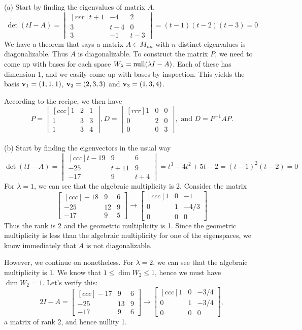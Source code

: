 \begin{solution}
\noindent 
(a) Start by finding the eigenvalues of matrix $A$.
$$
\det(t I - A) =
\begin{vmatrix}[rrr]
t +1&-4&2\\
3&t - 4&0\\
3&-1&t - 3
\end{vmatrix}
= (t - 1)(t - 2)(t - 3) = 0
$$
We have a theorem that says a matrix $A\in M_{nn}$ with $n$ distinct eigenvalues is diagonalizable. Thus $A$ is diagonalizable. To construct the matrix $P$, we need to come up with bases for each space $W_\lambda=\operatorname{null}(\lambda I-A)$. Each of these has dimension 1, and we easily come up with bases by inspection. This yields the basis ${\mathbf v}_1=(1,1,1)$, ${\mathbf v}_2=(2,3,3)$ and ${\mathbf v}_3=(1,3,4)$.  

According to the recipe, we then have 
$$
P =
\begin{bmatrix}[ccc]
1&2&1\\
1&3&3\\
1&3&4
\end{bmatrix}
,  D=
\begin{bmatrix}[rrr]
1&0&0\\
0&2&0\\
0&0&3
\end{bmatrix}, \text{ and } D=P^{-1}AP.
$$
\\
(b) 
Start by finding the eigenvectors in the usual way
$$\det(t I - A) =
\begin{vmatrix}[ccc]
t-19 &9&6\\
-25&t+11&9\\
-17&9&t +4
\end{vmatrix}
= t^3 - 4t^2+5t-2 = (t -1)^2(t-2) = 0
$$
For $\lambda = 1$, we can see that the algebraic multiplicity is 2. Consider the matrix
$$
\begin{bmatrix}[ccc]
-18 &9&6\\
-25&12&9\\
-17&9&5
\end{bmatrix}
\rightarrow
\begin{bmatrix}[ccc]
1&0&-1\\
0&1&-4/3\\
0&0&0
\end{bmatrix}
$$
Thus the rank is 2 and the geometric multiplicity is 1. Since the geometric multiplicity is less than the algebraic multiplicity for one of the eigenspaces, we know immediately that $A$ is not diagonalizable. 

However, we continue on nonetheless. For $\lambda =2$, we can see that the algebraic multiplicity is 1. We know that $1\leq \dim W_2\leq 1$, hence we must have $\dim W_2=1$. Let's verify this: 
$$
2I-A=
\begin{bmatrix}[ccc]
-17 &9&6\\
-25&13&9\\
-17&9&6
\end{bmatrix}
\rightarrow
\begin{bmatrix}[ccc]
1&0&-3/4\\
0&1&-3/4\\
0&0&0
\end{bmatrix},
$$
a matrix of rank 2, and hence nullity 1. 


\end{solution}
